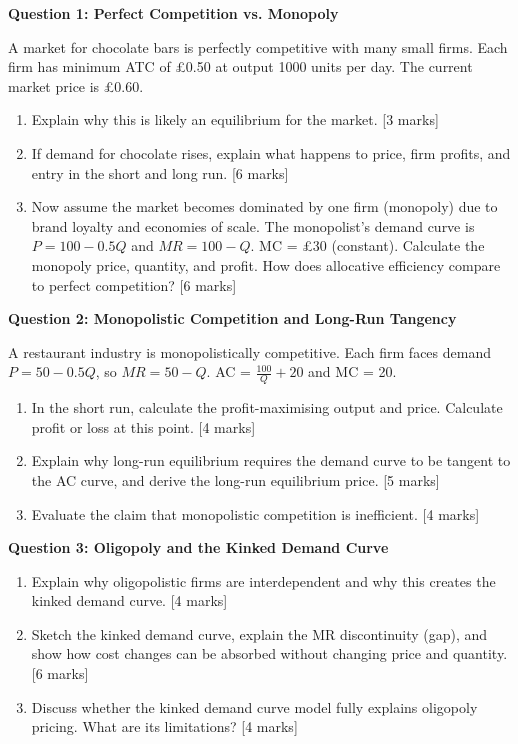 \documentclass[11pt, a4paper, twoside]{book}
\begin{document}
\begin{exampractice}
\textbf{Question 1: Perfect Competition vs. Monopoly}

A market for chocolate bars is perfectly competitive with many small firms. Each firm has minimum ATC of £0.50 at output 1000 units per day. The current market price is £0.60.

\begin{enumerate}[label=(\alph*)]
\item Explain why this is likely an equilibrium for the market. [3 marks]
\item If demand for chocolate rises, explain what happens to price, firm profits, and entry in the short and long run. [6 marks]
\item Now assume the market becomes dominated by one firm (monopoly) due to brand loyalty and economies of scale. The monopolist's demand curve is $P = 100 - 0.5Q$ and $MR = 100 - Q$. MC = £30 (constant). Calculate the monopoly price, quantity, and profit. How does allocative efficiency compare to perfect competition? [6 marks]
\end{enumerate}
\end{exampractice}

\begin{exampractice}
\textbf{Question 2: Monopolistic Competition and Long-Run Tangency}

A restaurant industry is monopolistically competitive. Each firm faces demand $P = 50 - 0.5Q$, so $MR = 50 - Q$. AC = $\frac{100}{Q} + 20$ and MC = 20.

\begin{enumerate}[label=(\alph*)]
\item In the short run, calculate the profit-maximising output and price. Calculate profit or loss at this point. [4 marks]
\item Explain why long-run equilibrium requires the demand curve to be tangent to the AC curve, and derive the long-run equilibrium price. [5 marks]
\item Evaluate the claim that monopolistic competition is inefficient. [4 marks]
\end{enumerate}
\end{exampractice}

\begin{exampractice}
\textbf{Question 3: Oligopoly and the Kinked Demand Curve}

\begin{enumerate}[label=(\alph*)]
\item Explain why oligopolistic firms are interdependent and why this creates the kinked demand curve. [4 marks]
\item Sketch the kinked demand curve, explain the MR discontinuity (gap), and show how cost changes can be absorbed without changing price and quantity. [6 marks]
\item Discuss whether the kinked demand curve model fully explains oligopoly pricing. What are its limitations? [4 marks]
\end{enumerate}
\end{exampractice}
\end{document}
